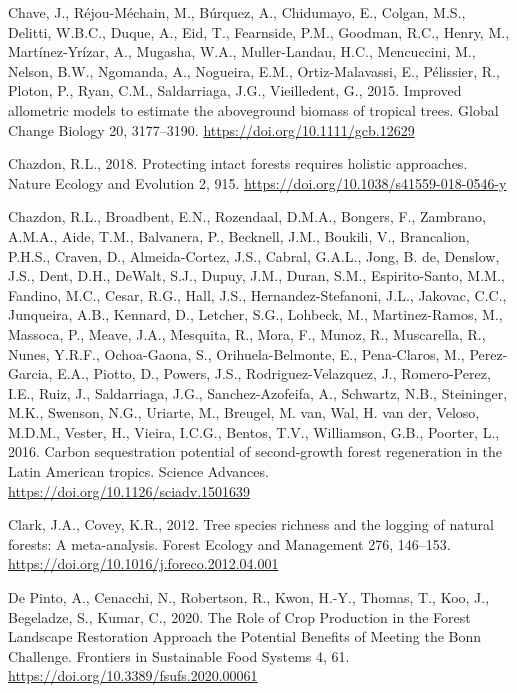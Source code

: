 \documentclass[
  12pt,
]{article}
\newlength{\cslhangindent}
\newlength{\cslentryspacingunit} %
\newenvironment{CSLReferences}[2] %
 {%
  \setlength{\parindent}{0pt}
  \ifodd #1
  \let\oldpar\par
  \def\par{\hangindent=\cslhangindent\oldpar}
  \fi
  \setlength{\parskip}{#2\cslentryspacingunit}
 }%
 {}
\begin{document}
\begin{CSLReferences}{1}{0}
\leavevmode{}%
Chave, J., Réjou-Méchain, M., Búrquez, A., Chidumayo, E., Colgan, M.S., Delitti, W.B.C., Duque, A., Eid, T., Fearnside, P.M., Goodman, R.C., Henry, M., Martínez-Yrízar, A., Mugasha, W.A., Muller-Landau, H.C., Mencuccini, M., Nelson, B.W., Ngomanda, A., Nogueira, E.M., Ortiz-Malavassi, E., Pélissier, R., Ploton, P., Ryan, C.M., Saldarriaga, J.G., Vieilledent, G., 2015. Improved allometric models to estimate the aboveground biomass of tropical trees. Global Change Biology 20, 3177--3190. \url{https://doi.org/10.1111/gcb.12629}

\leavevmode{}%
Chazdon, R.L., 2018. Protecting intact forests requires holistic approaches. Nature Ecology and Evolution 2, 915. \url{https://doi.org/10.1038/s41559-018-0546-y}

\leavevmode{}%
Chazdon, R.L., Broadbent, E.N., Rozendaal, D.M.A., Bongers, F., Zambrano, A.M.A., Aide, T.M., Balvanera, P., Becknell, J.M., Boukili, V., Brancalion, P.H.S., Craven, D., Almeida-Cortez, J.S., Cabral, G.A.L., Jong, B. de, Denslow, J.S., Dent, D.H., DeWalt, S.J., Dupuy, J.M., Duran, S.M., Espirito-Santo, M.M., Fandino, M.C., Cesar, R.G., Hall, J.S., Hernandez-Stefanoni, J.L., Jakovac, C.C., Junqueira, A.B., Kennard, D., Letcher, S.G., Lohbeck, M., Martinez-Ramos, M., Massoca, P., Meave, J.A., Mesquita, R., Mora, F., Munoz, R., Muscarella, R., Nunes, Y.R.F., Ochoa-Gaona, S., Orihuela-Belmonte, E., Pena-Claros, M., Perez-Garcia, E.A., Piotto, D., Powers, J.S., Rodriguez-Velazquez, J., Romero-Perez, I.E., Ruiz, J., Saldarriaga, J.G., Sanchez-Azofeifa, A., Schwartz, N.B., Steininger, M.K., Swenson, N.G., Uriarte, M., Breugel, M. van, Wal, H. van der, Veloso, M.D.M., Vester, H., Vieira, I.C.G., Bentos, T.V., Williamson, G.B., Poorter, L., 2016. Carbon sequestration potential of second-growth forest regeneration in the {Latin American} tropics. Science Advances. \url{https://doi.org/10.1126/sciadv.1501639}

\leavevmode{}%
Clark, J.A., Covey, K.R., 2012. Tree species richness and the logging of natural forests: {A} meta-analysis. Forest Ecology and Management 276, 146--153. \url{https://doi.org/10.1016/j.foreco.2012.04.001}

\leavevmode{}%
De Pinto, A., Cenacchi, N., Robertson, R., Kwon, H.-Y., Thomas, T., Koo, J., Begeladze, S., Kumar, C., 2020. The {Role} of {Crop Production} in the {Forest Landscape Restoration Approach} the {Potential Benefits} of {Meeting} the {Bonn Challenge}. Frontiers in Sustainable Food Systems 4, 61. \url{https://doi.org/10.3389/fsufs.2020.00061}


\end{CSLReferences}
\end{document}

